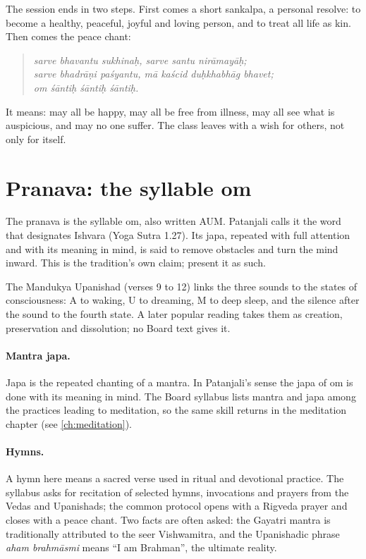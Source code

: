 The session ends in two steps. First comes a short sankalpa, a personal resolve: to become a healthy, peaceful, joyful and loving person, and to treat all life as kin. Then comes the peace chant:

\begin{quote}
\emph{sarve bhavantu sukhinaḥ, sarve santu nirāmayāḥ;\\
sarve bhadrāṇi paśyantu, mā kaścid duḥkhabhāg bhavet;\\
om śāntiḥ śāntiḥ śāntiḥ.}
\end{quote}

It means: may all be happy, may all be free from illness, may all see what is auspicious, and may no one suffer. The class leaves with a wish for others, not only for itself.

\section{Pranava: the syllable om}

The pranava is the syllable om, also written AUM. Patanjali calls it the word that designates Ishvara (Yoga Sutra 1.27). Its japa, repeated with full attention and with its meaning in mind, is said to remove obstacles and turn the mind inward. This is the tradition's own claim; present it as such.

The Mandukya Upanishad (verses 9 to 12) links the three sounds to the states of consciousness: A to waking, U to dreaming, M to deep sleep, and the silence after the sound to the fourth state. A later popular reading takes them as creation, preservation and dissolution; no Board text gives it.

\paragraph{Mantra japa.} Japa is the repeated chanting of a mantra. In Patanjali's sense the japa of om is done with its meaning in mind. The Board syllabus lists mantra and japa among the practices leading to meditation, so the same skill returns in the meditation chapter (see \cref{ch:meditation}).

\paragraph{Hymns.} A hymn here means a sacred verse used in ritual and devotional practice. The syllabus asks for recitation of selected hymns, invocations and prayers from the Vedas and Upanishads; the common protocol opens with a Rigveda prayer and closes with a peace chant. Two facts are often asked: the Gayatri mantra is traditionally attributed to the seer Vishwamitra, and the Upanishadic phrase \emph{aham brahmāsmi} means ``I am Brahman'', the ultimate reality.

